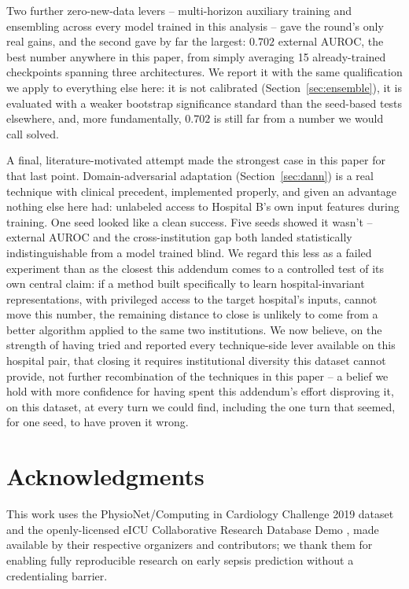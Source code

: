 \documentclass[11pt]{article}
\begin{document}
Two further zero-new-data levers -- multi-horizon auxiliary training and ensembling across every model trained in this analysis -- gave the round's only real gains, and the second gave by far the largest: $0.702$ external AUROC, the best number anywhere in this paper, from simply averaging 15 already-trained checkpoints spanning three architectures. We report it with the same qualification we apply to everything else here: it is not calibrated (Section~\ref{sec:ensemble}), it is evaluated with a weaker bootstrap significance standard than the seed-based tests elsewhere, and, more fundamentally, $0.702$ is still far from a number we would call solved.

A final, literature-motivated attempt made the strongest case in this paper for that last point. Domain-adversarial adaptation (Section~\ref{sec:dann}) is a real technique with clinical precedent, implemented properly, and given an advantage nothing else here had: unlabeled access to Hospital B's own input features during training. One seed looked like a clean success. Five seeds showed it wasn't -- external AUROC and the cross-institution gap both landed statistically indistinguishable from a model trained blind. We regard this less as a failed experiment than as the closest this addendum comes to a controlled test of its own central claim: if a method built specifically to learn hospital-invariant representations, with privileged access to the target hospital's inputs, cannot move this number, the remaining distance to close is unlikely to come from a better algorithm applied to the same two institutions. We now believe, on the strength of having tried and reported every technique-side lever available on this hospital pair, that closing it requires institutional diversity this dataset cannot provide, not further recombination of the techniques in this paper -- a belief we hold with more confidence for having spent this addendum's effort disproving it, on this dataset, at every turn we could find, including the one turn that seemed, for one seed, to have proven it wrong.

\section*{Acknowledgments}
This work uses the PhysioNet/Computing in Cardiology Challenge 2019 dataset \citep{reyna2019early} and the openly-licensed eICU Collaborative Research Database Demo \citep{pollard2018eicu}, made available by their respective organizers and contributors; we thank them for enabling fully reproducible research on early sepsis prediction without a credentialing barrier.
\end{document}

